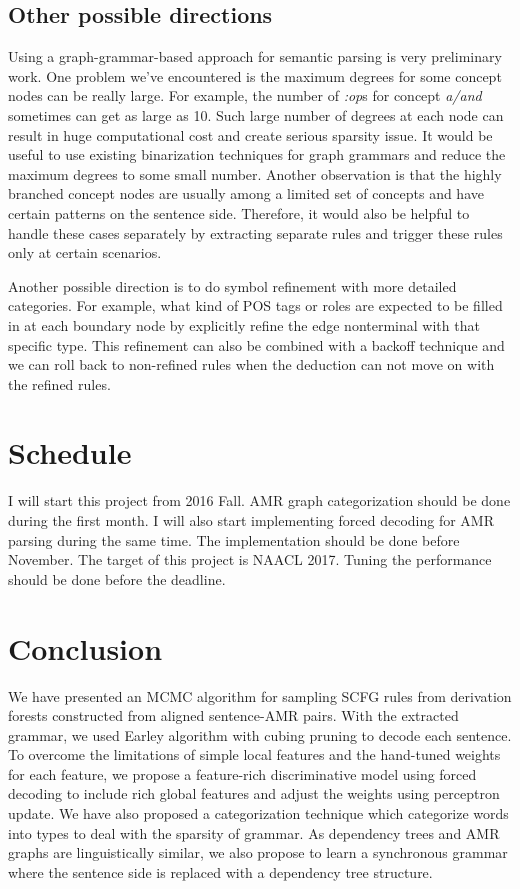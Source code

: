 \subsection{Other possible directions}
Using a graph-grammar-based approach for semantic parsing is very preliminary work. One problem we've encountered is the maximum degrees for some concept nodes
can be really large. For example, the number of \textit{:op}s for concept \textit{a/and} sometimes can get as large as 10. Such large number of degrees at each node can
result in huge computational cost and create serious sparsity issue. It would be useful to use existing binarization techniques for graph grammars and reduce the maximum degrees
to some small number. Another observation is that the highly branched concept nodes are usually among a limited set of concepts and have certain patterns on the sentence side. Therefore, it would also be helpful to
handle these cases separately by extracting separate rules and trigger these rules only at certain scenarios.


Another possible direction is to do symbol refinement with more detailed categories. For example, what kind of POS tags or roles are expected to be filled in at each
boundary node by explicitly refine the edge nonterminal with that specific type. This refinement can also be combined with a backoff technique and we can roll back
to non-refined rules when the deduction can not move on with the refined rules.
\section{Schedule}
I will start this project from 2016 Fall. AMR graph categorization should be done during the first month. I will also start implementing forced decoding for AMR parsing during the same time.
The implementation should be done before November. The target of this project is NAACL 2017. Tuning the performance should be done before the deadline.
\section{Conclusion}
We have presented an MCMC algorithm for sampling SCFG rules from derivation forests constructed from aligned sentence-AMR pairs.
With the extracted grammar, we used Earley algorithm with cubing pruning to decode each sentence. To overcome the limitations of
simple local features and the hand-tuned weights for each feature, we propose a feature-rich discriminative model using forced decoding to
include rich global features and adjust the weights using perceptron update.
We have also proposed a categorization technique which categorize words into types to deal with the sparsity of grammar. 
As dependency trees and AMR graphs are linguistically similar, we also propose to learn a synchronous grammar where the sentence side is replaced with a dependency tree structure.
